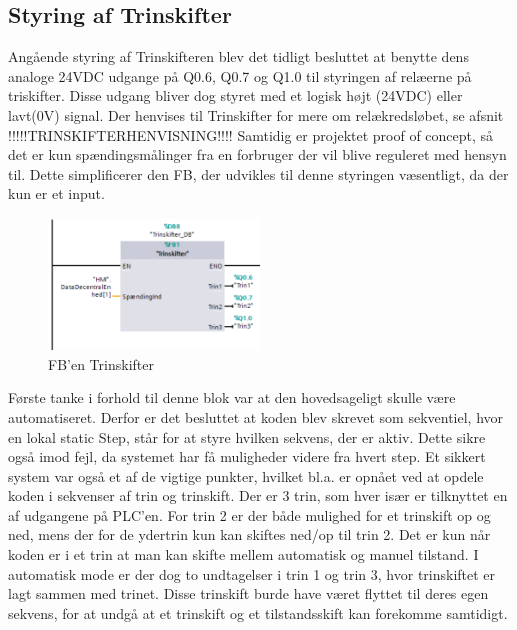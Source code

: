 \subsection{Styring af Trinskifter}

Angående styring af Trinskifteren blev det tidligt besluttet at benytte dens analoge 24VDC udgange på Q0.6, Q0.7 og Q1.0 til styringen af relæerne på triskifter. Disse udgang bliver dog styret med et logisk højt (24VDC) eller lavt(0V) signal. Der henvises til Trinskifter for mere om relækredsløbet, se afsnit !!!!!TRINSKIFTERHENVISNING!!!! %
Samtidig er projektet proof of concept, så det er kun spændingsmålinger fra en forbruger der vil blive reguleret med hensyn til. Dette simplificerer den FB, der udvikles til denne styringen væsentligt, da der kun er et input.

\begin{figure}[H] %
	\centering
	\includegraphics[width=0.5\textwidth]{Figure/PLCTrinskifter}
	\caption{FB'en Trinskifter}
	\label{fig:PLCTrinskifter}
\end{figure}

Første tanke i forhold til denne blok var at den hovedsageligt skulle være automatiseret. Derfor er det besluttet at koden blev skrevet som sekventiel, hvor en lokal static Step, står for at styre hvilken sekvens, der er aktiv. Dette sikre også imod fejl, da systemet har få muligheder videre fra hvert step. Et sikkert system var også et af de vigtige punkter, hvilket bl.a. er opnået ved at opdele koden i sekvenser af trin og trinskift. Der er 3 trin, som hver især er tilknyttet en af udgangene på PLC'en. For trin 2 er der både mulighed for et trinskift op og ned, mens der for de ydertrin kun kan skiftes ned/op til trin 2. Det er kun når koden er i et trin at man kan skifte mellem automatisk og manuel tilstand. I automatisk mode er der dog to undtagelser i trin 1 og trin 3, hvor trinskiftet er lagt sammen med trinet. Disse trinskift burde have været flyttet til deres egen sekvens, for at undgå at et trinskift og et tilstandsskift kan forekomme samtidigt.


